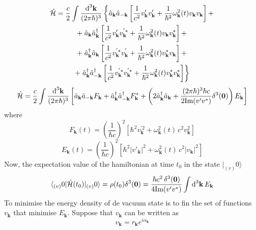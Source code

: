 \documentclass[pt=11, openany,twoside,a4paper]{scrbook}
\begin{document}
	\begin{multline}
		\hat{\mathcal{H}}=\frac{c}{2}\int\frac{\text{d}^3\mathbf{k}}{(2\pi\hbar)^3}\left\{\hat{a}_\mathbf{k}\hat{a}_{-\mathbf{k}}\left[\frac{1}{c^2}v'_\mathbf{k}v'_\mathbf{k}+\frac{1}{\hbar^2}\omega^2_\mathbf{k}(t)v_\mathbf{k}v_\mathbf{k}\right]+\right.\\
		+\left.\hat{a}_\mathbf{k}\hat{a}^\dagger_\mathbf{k}\left[\frac{1}{c^2}v'_\mathbf{k}v^{'*}_\mathbf{k}+\frac{1}{\hbar^2}\omega^2_\mathbf{k}(t)v_\mathbf{k}v^*_\mathbf{k}\right]+\right.\\
		+\left.\hat{a}^\dagger_\mathbf{k}\hat{a}_\mathbf{k}\left[\frac{1}{c^2}v^{'*}_\mathbf{k}v^{'}_\mathbf{k}+\frac{1}{\hbar^2}\omega^2_\mathbf{k}(t)v^*_\mathbf{k}v_\mathbf{k}\right]+\right.\\
		+\left.\hat{a}^\dagger_\mathbf{k}\hat{a}^\dagger_{-\mathbf{k}}\left[\frac{1}{c^2}v^{'*}_\mathbf{k}v^{'*}_\mathbf{k}+\frac{1}{\hbar^2}\omega^2_\mathbf{k}(t)v^*_\mathbf{k}v^*_\mathbf{k}\right]\right\}
	\end{multline}
	\begin{equation}
		\hat{\mathcal{H}}=\frac{c}{2}\int\frac{\text{d}^3\mathbf{k}}{(2\pi\hbar)^3}\left[\hat{a}_\mathbf{k}\hat{a}_{-\mathbf{k}}F_\mathbf{k}+\hat{a}^\dagger_\mathbf{k}\hat{a}^\dagger_{-\mathbf{k}}F_\mathbf{k}^*+\left(2\hat{a}_\mathbf{k}^\dagger\hat{a}_\mathbf{k}+\frac{(2\pi\hbar)^3\hbar c}{2\text{Im}(v'v^*)}\delta^3(\mathbf{0})\right)E_\mathbf{k}\right]
	\end{equation}
	where
	\begin{equation}
		F_\mathbf{k}(t)=\left(\frac{1}{\hbar c}\right)^2\left[\hbar^2v^{'2}_\mathbf{k}+\omega^2_\mathbf{k}(t)\,c^2 v_\mathbf{k}^2\right]
	\end{equation}
	\begin{equation}
		E_\mathbf{k}(t)=\left(\frac{1}{\hbar c}\right)^2\left[\hbar^2\big|v'_\mathbf{k}\big|^2+\omega^2_\mathbf{k}(t)\,c^2 \big|v_\mathbf{k}\big|^2\right]
	\end{equation}
	Now, the expectation value of the hamiltonian at time $t_0$ in the state $|_{(v)}0\rangle$
	\begin{equation}
		\langle_{(v)}0|\hat{\mathcal{H}}(t_0)|_{(v)}0\rangle=\rho(t_0)\delta^3(\mathbf{0})=\frac{\hbar c^2 \,\delta^3(\mathbf{0})}{4\text{Im}(v'v^*)}\int\text{d}^3\mathbf{k}\,E_\mathbf{k}
	\end{equation}
	To minimise the energy density of de vacuum state is to fin the set of functions $v_\mathbf{k}$ that minimise $E_\mathbf{k}$. Suppose that $v_\mathbf{k}$ can be written as
	\begin{equation}
		v_\mathbf{k}=r_\mathbf{k}e^{i\alpha_\mathbf{k}}
	\end{equation}
\end{document}

